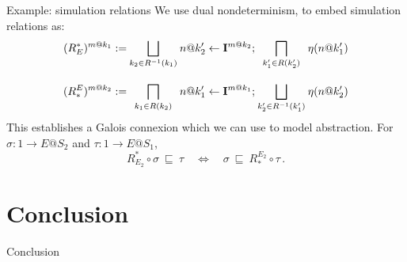 \documentclass[aspectratio=54]{beamer}
\begin{document}
\begin{frame}{Example: simulation relations} %
We use dual nondeterminism,
to embed simulation relations as:
\[
  {\everymath={\displaystyle}
  \begin{array}{r@{\:}c@{\:}c@{\:}c@{\:}l}
  (R^*_E)^{m@k_1} := &
    \bigsqcup_{k_2 \in R^{-1}(k_1)} &
    n@k_2' \leftarrow \mathbf{I}^{m@k_2} ; &
    \bigsqcap_{k_1' \in R(k_2')} &
    \eta(n@k_1') \\[2.5em]
  (R_*^E)^{m@k_2} := &
    \bigsqcap_{k_1 \in R(k_2)} &
    n@k_1' \leftarrow \mathbf{I}^{m@k_1} ; &
    \bigsqcup_{k_2' \in R^{-1}(k_1')} &
    \eta(n@k_2')
  \end{array}}
\]
This establishes a Galois connexion
which we can use to model abstraction.
For $\sigma : 1 \rightarrow E@S_2$
and $\tau : 1 \rightarrow E@S_1$,
\[
  R^*_{E_2} \!\circ \sigma \: \sqsubseteq \: \tau
  \quad \Leftrightarrow \quad
  \sigma \: \sqsubseteq \: R_*^{E_2} \!\circ \tau \,.
\]
\end{frame}


\section*{Conclusion} %

\begin{frame}{Conclusion}
\end{frame}

\end{document}

